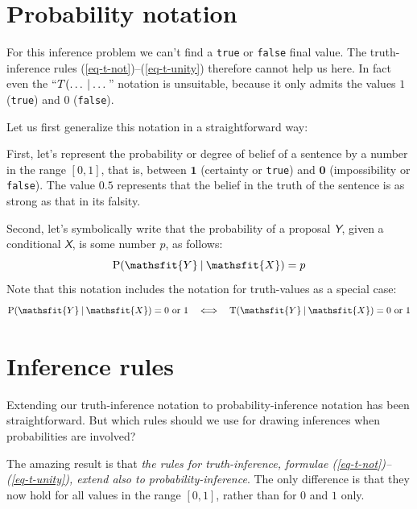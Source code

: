 \documentclass[
  a4paper,
  DIV=11,
  numbers=noendperiod,
  oneside]{scrreprt}
\begin{document}
\hypertarget{probability-notation}{%
\section{Probability notation}\label{probability-notation}}

For this inference problem we can't find a \texttt{true} or
\texttt{false} final value. The truth-inference rules
(\ref{eq-t-not})--(\ref{eq-t-unity}) therefore cannot help us here. In
fact even the
{``\(T(\dotso \nonscript\:\vert\nonscript\:\mathopen{} \dotso\)''}
notation is unsuitable, because it only admits the values \(1\)
(\texttt{true}) and \(0\) (\texttt{false}).

Let us first generalize this notation in a straightforward way:

First, let's represent the probability or degree of belief of a sentence
by a number in the range {\([0,1]\),} that is, between \(\mathbf{1}\)
(certainty or \texttt{true}) and \(\mathbf{0}\) (impossibility or
\texttt{false}). The value \(0.5\) represents that the belief in the
truth of the sentence is as strong as that in its falsity.

Second, let's symbolically write that the probability of a proposal
\(\mathsfit{Y}\), given a conditional \(\mathsfit{X}\), is some number
\(p\), as follows: \[
\mathrm{P}(\mathsfit{Y}\nonscript\:\vert\nonscript\:\mathopen{} \mathsfit{X}) = p
\] Note that this notation includes the notation for truth-values as a
special case: \[
\mathrm{P}(\mathsfit{Y}\nonscript\:\vert\nonscript\:\mathopen{} \mathsfit{X}) = 0\text{ or }1
\quad\Longleftrightarrow\quad
\mathrm{T}(\mathsfit{Y}\nonscript\:\vert\nonscript\:\mathopen{} \mathsfit{X}) = 0\text{ or }1
\]

\hypertarget{inference-rules}{%
\section{Inference rules}\label{inference-rules}}

Extending our truth-inference notation to probability-inference notation
has been straightforward. But which rules should we use for drawing
inferences when probabilities are involved?

The amazing result is that \emph{the rules for truth-inference, formulae
(\ref{eq-t-not})--(\ref{eq-t-unity}), extend also to
probability-inference}. The only difference is that they now hold for
all values in the range \([0,1]\), rather than for \(0\) and \(1\) only.
\end{document}
